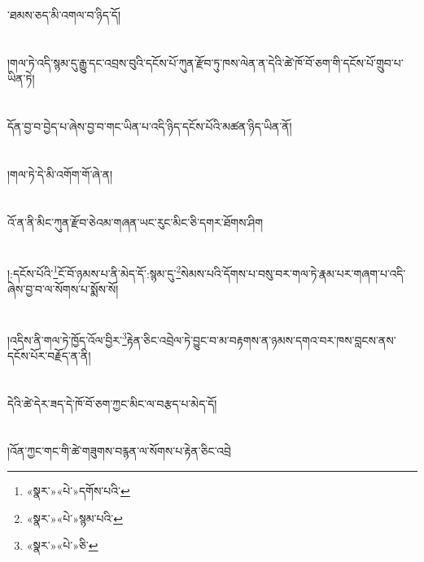 ་ཐམས་ཅད་མི་འགལ་བ་ཉིད་དོ།\chapter{ }།གལ་ཏེ་འདི་སྙམ་དུ་རྒྱུ་དང་འབྲས་བུའི་དངོས་པོ་ཀུན་རྫོབ་ཏུ་ཁས་ལེན་ན་དེའི་ཚེ་ཁོ་བོ་ཅག་གི་དངོས་པོ་གྲུབ་པ་ཡིན་ཏེ།\chapter{ }དོན་བྱ་བ་བྱེད་པ་ཞེས་བྱ་བ་གང་ཡིན་པ་འདི་ཉིད་དངོས་པོའི་མཚན་ཉིད་ཡིན་ནོ།\chapter{ }།གལ་ཏེ་དེ་མི་འགོག་གོ་ཞེ་ན།\chapter{ }འོ་ན་ནི་མིང་ཀུན་རྫོབ་ཅེའམ་གཞན་ཡང་རུང་མིང་ཅི་དགར་ཐོགས་ཤིག\chapter{ }།:དངོས་པོའི་\footnote{«སྣར་»«པེ་»དགོས་པའི་}ངོ་བོ་ཉམས་པ་ནི་མེད་དོ་:སྙམ་དུ་\footnote{«སྣར་»«པེ་»སྙམ་པའི་}སེམས་པའི་དོགས་པ་བསུ་བར་གལ་ཏེ་རྣམ་པར་གཞག་པ་འདི་ཞེས་བྱ་བ་ལ་སོགས་པ་སྨོས་སོ།\chapter{ }།འདིས་ནི་གལ་ཏེ་ཁྱོད་འོལ་བྱིར་\footnote{«སྣར་»«པེ་»ཅི་}རྟེན་ཅིང་འབྲེལ་ཏེ་བྱུང་བ་མ་བརྟགས་ན་ཉམས་དགའ་བར་ཁས་བླངས་ནས་དངོས་པོར་བརྗོད་ན་ནི།\chapter{ }དེའི་ཚེ་དེར་ཟད་དེ་ཁོ་བོ་ཅག་ཀྱང་མིང་ལ་བརྩད་པ་མེད་དོ།\chapter{ }།འོན་ཀྱང་གང་གི་ཚེ་གཟུགས་བརྙན་ལ་སོགས་པ་རྟེན་ཅིང་འབྲེ